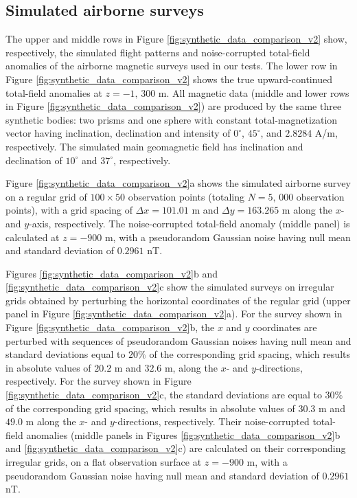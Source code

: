 \documentclass[manuscript]{geophysics}
\begin{document}
	\subsection*{Simulated airborne surveys}
	
	The upper and middle rows in Figure \ref{fig:synthetic_data_comparison_v2} show, respectively, 
	the simulated flight patterns and noise-corrupted total-field anomalies of the airborne magnetic 
	surveys used in our tests. The lower row in Figure \ref{fig:synthetic_data_comparison_v2} shows 
	the true upward-continued total-field anomalies at $z = -1, \, 300$ m.
	All magnetic data (middle and lower rows in Figure \ref{fig:synthetic_data_comparison_v2}) 
	are produced by the same three synthetic bodies: two prisms and one sphere with 
	constant total-magnetization vector having inclination, declination and intensity of 
	$0^{\circ}$, $45^{\circ}$, and $2.8284$ A/m, respectively. 
	The simulated main geomagnetic field has inclination and declination of $10^{\circ}$ and $37^{\circ}$,
	respectively. 
	
	
	Figure \ref{fig:synthetic_data_comparison_v2}a shows the simulated airborne survey on
	a regular grid of $100 \times 50$ observation points (totaling  $N = 5,\, 000$ observation points),
	with a grid spacing of $\Delta x = 101.01$ m and $\Delta y = 163.265$ m along the
	$x$- and $y$-axis, respectively.
	The noise-corrupted total-field anomaly (middle panel) is calculated at $z = -900$ m, with a
	pseudorandom Gaussian noise having null mean and standard deviation of $0.2961$ nT.
	
	
	Figures \ref{fig:synthetic_data_comparison_v2}b and \ref{fig:synthetic_data_comparison_v2}c 
	show the simulated surveys on irregular grids obtained by perturbing the horizontal coordinates
	of the regular grid (upper panel in Figure \ref{fig:synthetic_data_comparison_v2}a).
	For the survey shown in Figure \ref{fig:synthetic_data_comparison_v2}b, the $x$ and $y$ coordinates 
	are perturbed with sequences of pseudorandom Gaussian noises having null mean and standard deviations
	equal to $20\%$ of the corresponding grid spacing, which results in
	absolute values of $20.2$ m and $32.6$ m, along the $x$- and $y$-directions, respectively.
	For the survey shown in Figure \ref{fig:synthetic_data_comparison_v2}c, the standard deviations
	are equal to $30\%$ of the corresponding grid spacing, which results in absolute values of 
	$30.3$ m and $49.0$ m along the $x$- and $y$-directions, respectively.
	Their noise-corrupted total-field anomalies (middle panels in Figures 
	\ref{fig:synthetic_data_comparison_v2}b and \ref{fig:synthetic_data_comparison_v2}c) are calculated 
	on their corresponding irregular grids, on a flat observation surface at $z = -900$ m, 
	with a pseudorandom Gaussian noise having null mean and standard deviation of $0.2961$ nT.
	
\end{document}
